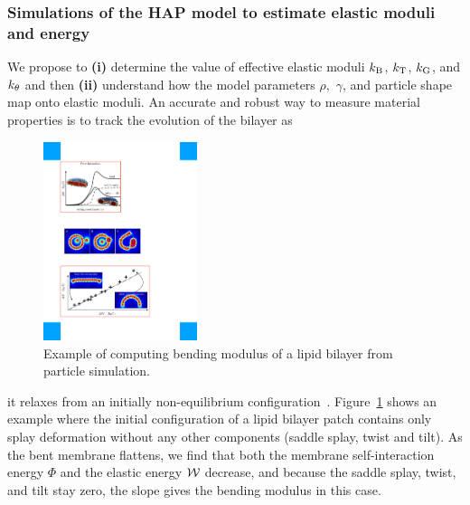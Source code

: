 \subsubsection{Simulations of the HAP model to estimate elastic moduli
and energy}
We propose to
%
%
%
{\bf (i)} determine the value of effective elastic moduli $k_{\mathrm{B}}$,
$k_{\mathrm{T}}$, $k_{\mathrm{G}}$, and $k_{\theta}$ and then {\bf (ii)} understand how the model parameters $\rho,$ $\gamma$, and
particle shape map onto elastic moduli. 
An accurate and robust way to measure material properties is to track the evolution of the bilayer as
%
\begin{figure}
\vspace{-0.3cm}
\centerline{\includegraphics[width=0.4\textwidth]{Figures/Flattening.pdf}}
\vspace{-0.2cm}
\caption{\label{fig:flattening} \footnotesize Example of computing
  bending modulus of a lipid bilayer from particle simulation.}
\end{figure}
it relaxes from an initially non-equilibrium
configuration~\cite{PhysRevLett.117.188102}. Figure~\ref{fig:flattening}
shows an example where the initial configuration of a lipid bilayer
patch contains only splay deformation without any other components
(saddle splay, twist and tilt). As the bent membrane flattens, we find
that both the membrane self-interaction energy $\Phi$ and the elastic
energy ${\cal W}$ decrease, and because the saddle splay, twist, and
tilt stay zero, the slope gives the bending modulus in this case. 

